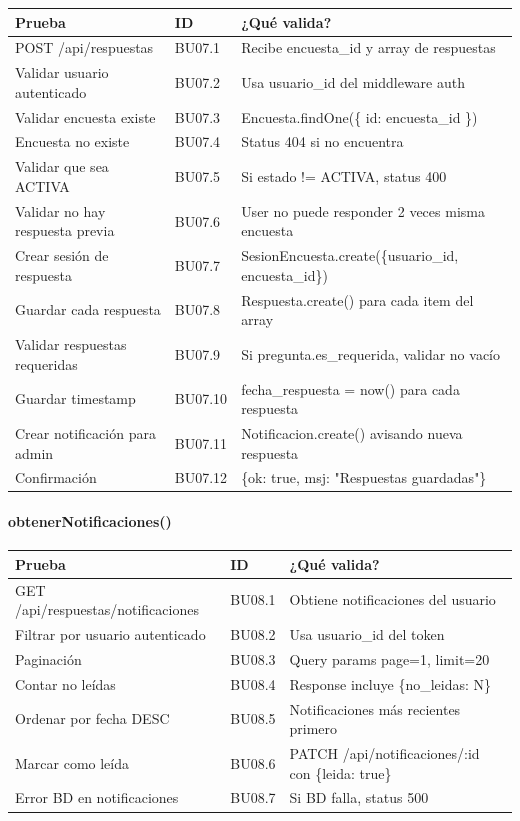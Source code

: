 \begin{table}[H]
\centering
\begin{tabular}{|l|l|p{6cm}|}
\hline
\textbf{Prueba} & \textbf{ID} & \textbf{¿Qué valida?} \\ \hline
POST /api/respuestas & BU07.1 & Recibe encuesta\_id y array de respuestas \\ \hline
Validar usuario autenticado & BU07.2 & Usa usuario\_id del middleware auth \\ \hline
Validar encuesta existe & BU07.3 & Encuesta.findOne(\{ id: encuesta\_id \}) \\ \hline
Encuesta no existe & BU07.4 & Status 404 si no encuentra \\ \hline
Validar que sea ACTIVA & BU07.5 & Si estado != ACTIVA, status 400 \\ \hline
Validar no hay respuesta previa & BU07.6 & User no puede responder 2 veces misma encuesta \\ \hline
Crear sesión de respuesta & BU07.7 & SesionEncuesta.create(\{usuario\_id, encuesta\_id\}) \\ \hline
Guardar cada respuesta & BU07.8 & Respuesta.create() para cada item del array \\ \hline
Validar respuestas requeridas & BU07.9 & Si pregunta.es\_requerida, validar no vacío \\ \hline
Guardar timestamp & BU07.10 & fecha\_respuesta = now() para cada respuesta \\ \hline
Crear notificación para admin & BU07.11 & Notificacion.create() avisando nueva respuesta \\ \hline
Confirmación & BU07.12 & \{ok: true, msj: "Respuestas guardadas"\} \\ \hline
\end{tabular}
\end{table}

\paragraph{obtenerNotificaciones()}

\begin{table}[H]
\centering
\begin{tabular}{|l|l|p{6cm}|}
\hline
\textbf{Prueba} & \textbf{ID} & \textbf{¿Qué valida?} \\ \hline
GET /api/respuestas/notificaciones & BU08.1 & Obtiene notificaciones del usuario \\ \hline
Filtrar por usuario autenticado & BU08.2 & Usa usuario\_id del token \\ \hline
Paginación & BU08.3 & Query params page=1, limit=20 \\ \hline
Contar no leídas & BU08.4 & Response incluye \{no\_leidas: N\} \\ \hline
Ordenar por fecha DESC & BU08.5 & Notificaciones más recientes primero \\ \hline
Marcar como leída & BU08.6 & PATCH /api/notificaciones/:id con \{leida: true\} \\ \hline
Error BD en notificaciones & BU08.7 & Si BD falla, status 500 \\ \hline
\end{tabular}
\end{table}

